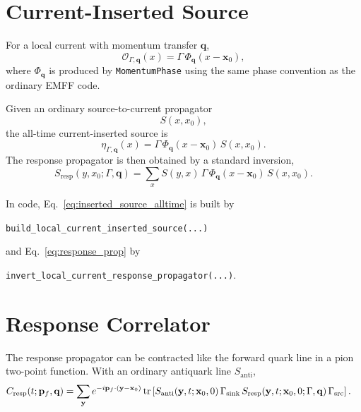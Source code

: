 \documentclass[11pt,a4paper]{article}
\newcommand{\Sresp}{S_{\mathrm{resp}}}
\newcommand{\Ocur}{\mathcal{O}}
\newcommand{\gsrc}{\Gamma_{\mathrm{src}}}
\newcommand{\gsink}{\Gamma_{\mathrm{sink}}}
\newcommand{\Cresp}{C_{\mathrm{resp}}}
\begin{document}
\section{Current-Inserted Source}

For a local current with momentum transfer \(\mathbf q\),
\begin{equation}
  \Ocur_{\Gamma,\mathbf q}(x)
  =
  \Gamma\,\Phi_{\mathbf q}(x-\mathbf x_0),
\end{equation}
where \(\Phi_{\mathbf q}\) is produced by \texttt{MomentumPhase} using the same
phase convention as the ordinary EMFF code.

Given an ordinary source-to-current propagator
\begin{equation}
  S(x,x_0),
\end{equation}
the all-time current-inserted source is
\begin{equation}
  \eta_{\Gamma,\mathbf q}(x)
  =
  \Gamma\,\Phi_{\mathbf q}(x-\mathbf x_0)\,S(x,x_0).
\label{eq:inserted_source_alltime}
\end{equation}
The response propagator is then obtained by a standard inversion,
\begin{equation}
  \Sresp(y,x_0;\Gamma,\mathbf q)
  =
  \sum_x S(y,x)\,
  \Gamma\,\Phi_{\mathbf q}(x-\mathbf x_0)\,
  S(x,x_0).
\label{eq:response_prop}
\end{equation}

In code, Eq.~\eqref{eq:inserted_source_alltime} is built by
\begin{center}
\texttt{build\_local\_current\_inserted\_source(...)}
\end{center}
and Eq.~\eqref{eq:response_prop} by
\begin{center}
\texttt{invert\_local\_current\_response\_propagator(...)}.
\end{center}

\section{Response Correlator}

The response propagator can be contracted like the forward quark line in a pion
two-point function.  With an ordinary antiquark line \(S_{\mathrm{anti}}\),
\begin{align}
  \Cresp(t;\mathbf p_f,\mathbf q)
  &=
  \sum_{\mathbf y}
  e^{-i\mathbf p_f\cdot(\mathbf y-\mathbf x_0)}
  \tr\left[
    S_{\mathrm{anti}}(\mathbf y,t;\mathbf x_0,0)\,
    \gsink\,
    \Sresp(\mathbf y,t;\mathbf x_0,0;\Gamma,\mathbf q)\,
    \gsrc
  \right].
\label{eq:Cresponse}
\end{align}
\end{document}
